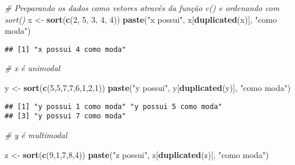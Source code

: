 \documentclass[12pt,]{style/krantz}
\makeatletter
\newenvironment{Shaded}{\begin{snugshade}}{\end{snugshade}}
\newcommand{\KeywordTok}[1]{\textcolor[rgb]{0.13,0.29,0.53}{\textbf{#1}}}
\newcommand{\DecValTok}[1]{\textcolor[rgb]{0.00,0.00,0.81}{#1}}
\newcommand{\StringTok}[1]{\textcolor[rgb]{0.31,0.60,0.02}{#1}}
\newcommand{\CommentTok}[1]{\textcolor[rgb]{0.56,0.35,0.01}{\textit{#1}}}
\newcommand{\NormalTok}[1]{#1}
\newenvironment{kframe}{%
\medskip{}
\setlength{\fboxsep}{.8em}
 \def\at@end@of@kframe{}%
 \ifinner\ifhmode%
  \def\at@end@of@kframe{\end{minipage}}%
  \begin{minipage}{\columnwidth}%
 \fi\fi%
 \def\FrameCommand##1{\hskip\@totalleftmargin \hskip-\fboxsep
 \colorbox{shadecolor}{##1}\hskip-\fboxsep
     \hskip-\linewidth \hskip-\@totalleftmargin \hskip\columnwidth}%
 \MakeFramed {\advance\hsize-\width
   \@totalleftmargin\z@ \linewidth\hsize
   \@setminipage}}%
 {\par\unskip\endMakeFramed%
 \at@end@of@kframe}
\renewenvironment{Shaded}{\begin{kframe}}{\end{kframe}}
\theoremstyle{definition}
\theoremstyle{definition}
\theoremstyle{definition}
\theoremstyle{remark}
\makeatother
\begin{document}
\begin{Shaded}
\begin{Highlighting}[]
\CommentTok{# Preparando os dados como vetores através da função c() e ordenando com sort()}
\NormalTok{x <-}\StringTok{ }\KeywordTok{sort}\NormalTok{(}\KeywordTok{c}\NormalTok{(}\DecValTok{2}\NormalTok{, }\DecValTok{5}\NormalTok{, }\DecValTok{3}\NormalTok{, }\DecValTok{4}\NormalTok{, }\DecValTok{4}\NormalTok{))}
\KeywordTok{paste}\NormalTok{(}\StringTok{"x possui"}\NormalTok{, x[}\KeywordTok{duplicated}\NormalTok{(x)], }\StringTok{"como moda"}\NormalTok{)}
\end{Highlighting}
\end{Shaded}

\begin{verbatim}
## [1] "x possui 4 como moda"
\end{verbatim}

\begin{Shaded}
\begin{Highlighting}[]
\CommentTok{# x é unimodal}

\NormalTok{y <-}\StringTok{ }\KeywordTok{sort}\NormalTok{(}\KeywordTok{c}\NormalTok{(}\DecValTok{5}\NormalTok{,}\DecValTok{5}\NormalTok{,}\DecValTok{7}\NormalTok{,}\DecValTok{7}\NormalTok{,}\DecValTok{6}\NormalTok{,}\DecValTok{1}\NormalTok{,}\DecValTok{2}\NormalTok{,}\DecValTok{1}\NormalTok{))}
\KeywordTok{paste}\NormalTok{(}\StringTok{"y possui"}\NormalTok{, y[}\KeywordTok{duplicated}\NormalTok{(y)], }\StringTok{"como moda"}\NormalTok{)}
\end{Highlighting}
\end{Shaded}

\begin{verbatim}
## [1] "y possui 1 como moda" "y possui 5 como moda"
## [3] "y possui 7 como moda"
\end{verbatim}

\begin{Shaded}
\begin{Highlighting}[]
\CommentTok{# y é multimodal}

\NormalTok{z <-}\StringTok{ }\KeywordTok{sort}\NormalTok{(}\KeywordTok{c}\NormalTok{(}\DecValTok{9}\NormalTok{,}\DecValTok{1}\NormalTok{,}\DecValTok{7}\NormalTok{,}\DecValTok{8}\NormalTok{,}\DecValTok{4}\NormalTok{))}
\KeywordTok{paste}\NormalTok{(}\StringTok{"z possui"}\NormalTok{, z[}\KeywordTok{duplicated}\NormalTok{(z)], }\StringTok{"como moda"}\NormalTok{)}
\end{Highlighting}
\end{Shaded}
\end{document}
